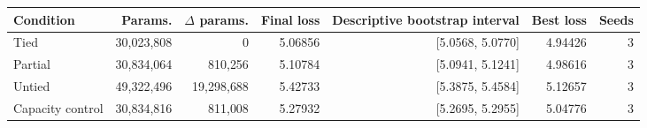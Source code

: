 \begin{tabular}{lrrrrrr}
\toprule
Condition & Params. & $\Delta$ params. & Final loss & Descriptive bootstrap interval & Best loss & Seeds \\
\midrule
Tied & 30{,}023{,}808 & 0 & 5.06856 & [5.0568, 5.0770] & 4.94426 & 3 \\
Partial & 30{,}834{,}064 & 810{,}256 & 5.10784 & [5.0941, 5.1241] & 4.98616 & 3 \\
Untied & 49{,}322{,}496 & 19{,}298{,}688 & 5.42733 & [5.3875, 5.4584] & 5.12657 & 3 \\
Capacity control & 30{,}834{,}816 & 811{,}008 & 5.27932 & [5.2695, 5.2955] & 5.04776 & 3 \\
\bottomrule
\end{tabular}
